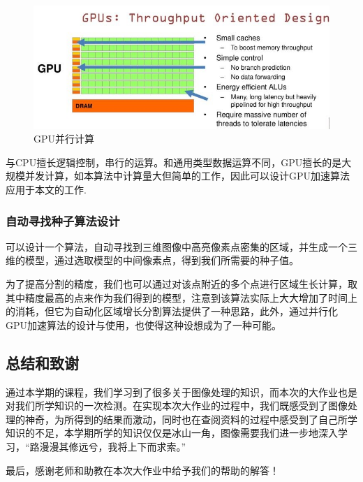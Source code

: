 \documentclass[UTF8]{ctexart}
\begin{document}
    \begin{figure}[H]
        \centering  %
        \includegraphics[scale=0.4]{figure/Gpu structure.jpg}
        \caption{GPU并行计算}
    \end{figure}

	与CPU擅长逻辑控制，串行的运算。和通用类型数据运算不同，GPU擅长的是大规模并发计算，如本算法中计算量大但简单的工作，因此可以设计GPU加速算法应用于本文的工作.
	
	\subsubsection{自动寻找种子算法设计}

	可以设计一个算法，自动寻找到三维图像中高亮像素点密集的区域，并生成一个三维的模型，通过选取模型的中间像素点，得到我们所需要的种子值。

	为了提高分割的精度，我们也可以通过对该点附近的多个点进行区域生长计算，取其中精度最高的点来作为我们得到的模型，注意到该算法实际上大大增加了时间上的消耗，但它为自动化区域增长分割算法提供了一种思路，此外，通过并行化GPU加速算法的设计与使用，也使得这种设想成为了一种可能。

	\subsection{总结和致谢}

    通过本学期的课程，我们学习到了很多关于图像处理的知识，而本次的大作业也是对我们所学知识的一次检测。在实现本次大作业的过程中，我们既感受到了图像处理的神奇，为所得到的结果而激动，同时也在查阅资料的过程中感受到了自己所学知识的不足，本学期所学的知识仅仅是冰山一角，图像需要我们进一步地深入学习，“路漫漫其修远兮，我将上下而求索。”
    
    最后，感谢老师和助教在本次大作业中给予我们的帮助的解答！
\end{document}
